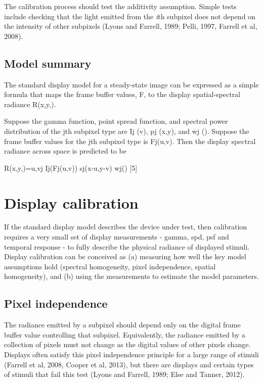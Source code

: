 \documentclass[
  letterpaper,
]{book}
\begin{document}
The calibration process should test the additivity assumption. Simple
tests include checking that the light emitted from the \emph{i}th
subpixel does not depend on the intensity of other subpixels (Lyons and
Farrell, 1989; Pelli, 1997, Farrell et al, 2008).

\subsection{\texorpdfstring{\textbf{Model
summary}}{Model summary}}\label{model-summary}

The standard display model for a steady-state image can be expressed as
a simple formula that maps the frame buffer values, F, to the display
spatial-spectral radiance R(x,y,).

Suppose the gamma function, point spread function, and spectral power
distribution of the jth subpixel type are Ij (v), pj (x,y), and wj ().
Suppose the frame buffer values for the jth subpixel type is Fj(u,v).
Then the display spectral radiance across space is predicted to be

R(x,y,)=u,vj Ij(Fj(u,v)) sj(x-u,y-v) wj() {[}5{]}

\section{Display calibration}\label{display-calibration}

If the standard display model describes the device under test, then
calibration requires a very small set of display measurements - gamma,
spd, psf and temporal response - to fully describe the physical radiance
of displayed stimuli. Display calibration can be conceived as (a)
measuring how well the key model assumptions hold (spectral homogeneity,
pixel independence, spatial homogeneity), and (b) using the measurements
to estimate the model parameters.

\subsection{\texorpdfstring{\textbf{Pixel
independence}}{Pixel independence}}\label{pixel-independence}

The radiance emitted by a subpixel should depend only on the digital
frame buffer value controlling that subpixel. Equivalently, the radiance
emitted by a collection of pixels must not change as the digital values
of other pixels change. Displays often satisfy this pixel independence
principle for a large range of stimuli (Farrell et al, 2008, Cooper et
al, 2013), but there are displays and certain types of stimuli that fail
this test (Lyons and Farrell, 1989; Else and Tanner, 2012).
\end{document}
